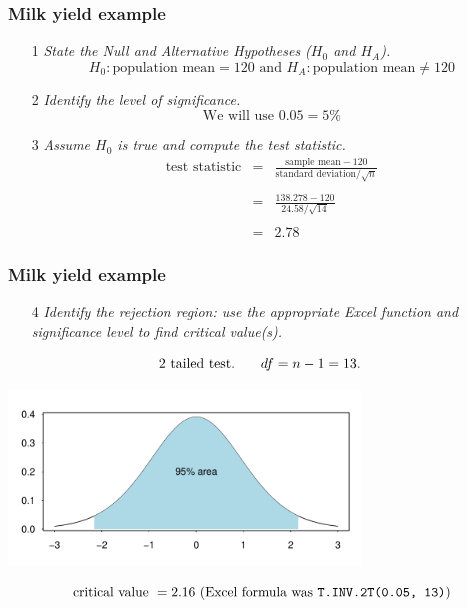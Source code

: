 \documentclass[12pt,xcolor=dvipsnames,handout,mathserif,aspectratio=169]{beamer}
\begin{document}
\begin{frame}\frametitle{Milk yield example}
\begin{enumerate}
\item[1] \emph{State the Null and Alternative Hypotheses ($H_0$ and $H_A$).}
$$H_{0}: \mbox{population mean} = 120 \mbox{ and } H_{A}: \mbox{population mean} \neq 120$$
\item[2] \emph{Identify the level of significance.}
$$\mbox{We will use } 0.05  = 5\%$$
\item[3] \emph{Assume $H_0$ is true and compute the test statistic. }
\begin{eqnarray*} 
\mbox{test statistic} & = &\frac{\mbox{sample mean} - 120}{\mbox{standard deviation}/\sqrt{n}} \\
 & & \\
 &=& \frac{138.278 - 120}{24.58/\sqrt{14}} \\
  & & \\
 & =& 2.78
\end{eqnarray*}
\end{enumerate}
\end{frame}

\begin{frame}
\frametitle{Milk yield example}
\begin{enumerate}
\item[4] \emph{Identify the rejection region: use the appropriate Excel function and significance level to find critical value(s).\\}
\end{enumerate}
$$\mbox{2 tailed test. } \hspace{0.5cm} df =  n - 1 = 13.$$ 
\vspace{-0.8cm}
\begin{center}
\includegraphics[width=0.7\textwidth]{t_plot.pdf}
\end{center}
$$\mbox{ critical value } = 2.16 \mbox{ (Excel formula was \texttt{T.INV.2T(0.05, 13)})}$$


\end{frame}
\end{document}
